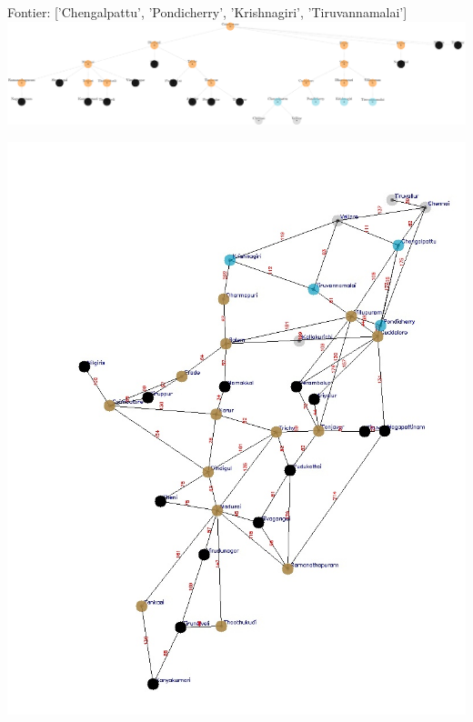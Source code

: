 \documentclass[xcolor=table]{beamer}
\begin{document}
\begin{frame}
  { \tiny Fontier: ['Chengalpattu', 'Pondicherry', 'Krishnagiri', 'Tiruvannamalai']}
  \includegraphics[width=1\textwidth]{../BFSNodes/42-1.png}
  \begin{center}
    \includegraphics[height=0.6\textheight]{../BFSoutput/tamilBFS40.jpg}
  \end{center}
\end{frame}
\end{document}

